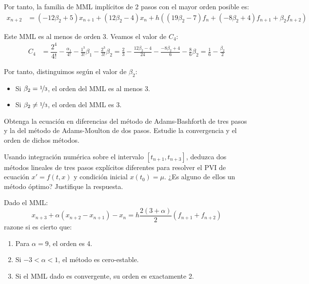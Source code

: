 \begin{ejercicio}
    Por tanto, la familia de MML implícitos de 2 pasos con el mayor orden posible es:
    \begin{align*}
        x_{n+2} &= (-12\beta_2 + 5)x_{n+1} + (12\beta_2 - 4)x_n + h\left((19\beta_2 - 7)f_n + (-8\beta_2 + 4)f_{n+1} + \beta_2 f_{n+2}\right)
    \end{align*}

    Este MML es al menos de orden 3. Veamos el valor de $C_4$:
    \begin{align*}
        C_4 &= \dfrac{2^4}{4!} -\frac{\alpha_1}{4!} - \frac{1^3}{3!}\beta_1- \frac{2^3}{3!}\beta_2
        = \frac{2}{3} - \frac{12\beta_2-4}{24} - \frac{-8\beta_2+4}{6} - \frac{8}{6}\beta_2
        = \frac{1}{6} - \frac{\beta_2}{2}
    \end{align*}

    Por tanto, distinguimos según el valor de $\beta_2$:
    \begin{itemize}
        \item Si $\beta_2=\nicefrac{1}{3}$, el orden del MML es al menos $3$.
        \item Si $\beta_2\neq \nicefrac{1}{3}$, el orden del MML es $3$.
    \end{itemize}
    
    
    
\end{ejercicio}

\begin{ejercicio}\label{ej:3.1.14}
    Obtenga la ecuación en diferencias del método de Adams-Bashforth de tres pasos y la del método de Adams-Moulton de dos pasos. Estudie la convergencia y el orden de dichos métodos.
\end{ejercicio}

\begin{ejercicio}\label{ej:3.1.15}
    Usando integración numérica sobre el intervalo $[t_{n+1}, t_{n+3}]$, deduzca dos métodos lineales de tres pasos explícitos diferentes para resolver el PVI de ecuación $x' = f(t, x)$ y condición inicial $x(t_0) = \mu$. ¿Es alguno de ellos un método óptimo? Justifique la respuesta.
\end{ejercicio}

\begin{ejercicio}\label{ej:3.1.16}
    Dado el MML:
    \begin{equation*}
        x_{n+3} + \alpha (x_{n+2} - x_{n+1}) - x_n = h \frac{2(3 + \alpha)}{2} (f_{n+1} + f_{n+2})
    \end{equation*}
    razone si es cierto que:
    \begin{enumerate}
        \item Para $\alpha = 9$, el orden es 4.
        \item Si $-3 < \alpha < 1$, el método es cero-estable.
        \item Si el MML dado es convergente, su orden es exactamente 2.
    \end{enumerate}
\end{ejercicio}

